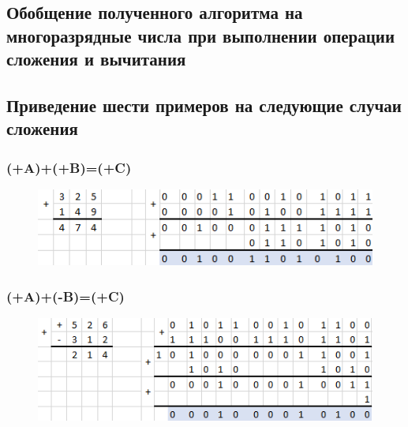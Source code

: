 \documentclass[a4paper,14pt]{article}
\begin{document}
\subsection{Обобщение полученного алгоритма на многоразрядные числа при выполнении операции сложения и вычитания}

\subsection{Приведение шести примеров на следующие случаи сложения}

\subsubsection{(+A)+(+B)=(+C)}


\begin{figure}[H]
	\centering
	\includegraphics[width=0.7\linewidth]{primeri/screenshot001}
	\caption{}
	\label{fig:screenshot001}
\end{figure}



\subsubsection{(+A)+(-B)=(+C)}


\begin{figure}[H]
	\centering
	\includegraphics[width=0.7\linewidth]{primeri/screenshot002}
	\caption{}
	\label{fig:screenshot002}
\end{figure}
\end{document}

